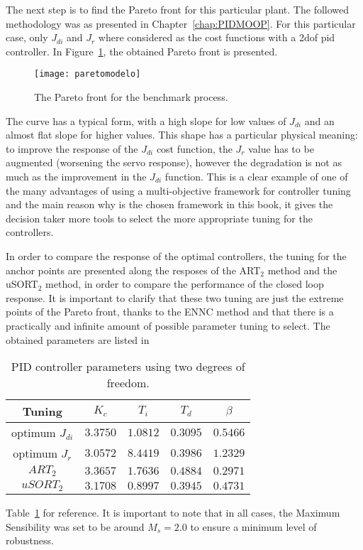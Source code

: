 The next step is to find the Pareto front for this particular plant. The followed methodology was as presented in Chapter~\ref{chap:PIDMOOP}. For this particular case, only $J_{di}$ and $J_r$ where considered as the cost functions with a \gls{2dof} \gls{pid} controller. In Figure~\ref{fig:paretomodelo}, the obtained Pareto front is presented. 
\begin{figure}[tb]%
	\centering
	\texttt{[image: paretomodelo]}%
	\caption{The Pareto front for the benchmark process.}%
	\label{fig:paretomodelo}%
\end{figure}

The curve has a typical form, with a high slope for low values of $J_{di}$ and an almost flat slope for higher values. This shape has a particular physical meaning: to improve the response of the $J_{di}$ cost function, the $J_{r}$ value has to be augmented (worsening the servo response), however the degradation is not as much as the improvement in the $J_{di}$ function. This is a clear example of one of the many advantages of using a multi-objective framework for controller tuning and the main reason why is the chosen framework in this book, it gives the decision taker more tools to select the more appropriate tuning for the controllers.

In order to compare the response of the optimal controllers, the tuning for the anchor points are presented along the resposes of the ART$_2$ method \cite{Vilanova2011} and the uSORT$_2$ method\cite{Alfaro2012a}, in order to compare the performance of the closed loop response. It is important to clarify that these two tuning are just the extreme points of the Pareto front, thanks to the ENNC method and that there is a practically and infinite amount of possible parameter tuning to select. The obtained parameters are listed in %
%
\begin{table}[tb]
	\caption{PID controller parameters using two degrees of freedom.}
	\centering
	\begin{tabular}{@{}*{5}{c}@{}}
		\toprule
		Tuning              &$K_c$       &$T_i$      &$T_d$     & $\beta$ 	\\
		\midrule              
		optimum $J_{di}$     &$3.3750$   & $1.0812$  &$0.3095$  &$0.5466$   \\
		optimum $J_{r}$      &$3.0572$   & $8.4419$  &$0.3986$  &$1.2329$   \\
		$ART_2$             &$3.3657$   & $1.7636$  &$0.4884$  &$0.2971$   \\
		$uSORT_2$           &$3.1708$   & $0.8997$  &$0.3945$  &$0.4731$   \\	
		\bottomrule				
	\end{tabular}
	\label{tab:parametroscontrolador}
\end{table}
%
Table~\ref{tab:parametroscontrolador} for reference. It is important to note that in all cases, the Maximum Sensibility was set to be around $M_s = 2.0$ to ensure a minimum level of robustness.

